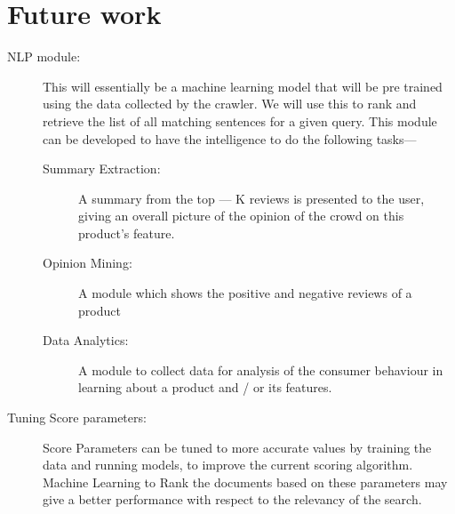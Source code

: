 \documentclass{article}
\begin{document}
\section{Future work}
\begin{description}
  \item[NLP module:] This will essentially be a machine learning model that will be pre trained using the data collected by the crawler. We will use this to rank and retrieve the list of all matching sentences for a given query. This module can be developed to have the intelligence to do the following tasks---
	\begin{description}
		\item[Summary Extraction: ] A summary from the top --- K reviews is presented to the user, giving an overall picture of the opinion of the crowd on this product's feature. 
		\item[Opinion Mining:] A module which shows the positive and negative reviews of a product
		\item[Data Analytics:] A module to collect data for analysis of the consumer behaviour in learning about a product and / or its features.
	\end{description}
 \item[Tuning Score parameters: ] Score Parameters can be tuned to more accurate values by training the data and running models, to improve the current scoring algorithm. Machine Learning to Rank the documents based on these parameters  may give a better performance with respect to the relevancy of the search.

\end{description}



\end{document}
